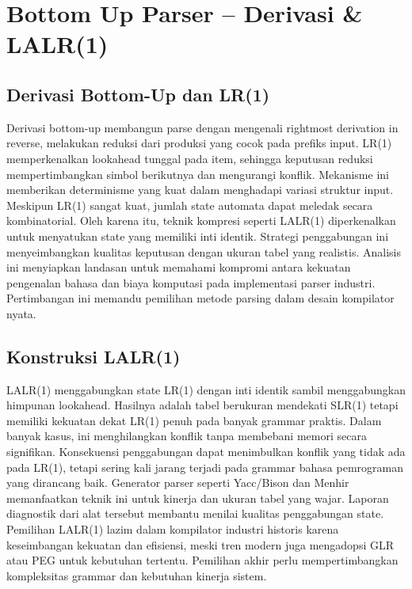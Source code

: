 \documentclass[../main.tex]{subfiles}
\begin{document}
\chapter{Bottom Up Parser – Derivasi \& LALR(1)}
\label{ch:lalr1}

\section{Derivasi Bottom-Up dan LR(1)}
Derivasi bottom-up membangun parse dengan mengenali rightmost derivation in reverse, melakukan reduksi dari produksi yang cocok pada prefiks input. LR(1) memperkenalkan lookahead tunggal pada item, sehingga keputusan reduksi mempertimbangkan simbol berikutnya dan mengurangi konflik.\cite{aho-dragon-book-2006} Mekanisme ini memberikan determinisme yang kuat dalam menghadapi variasi struktur input.
Meskipun LR(1) sangat kuat, jumlah state automata dapat meledak secara kombinatorial. Oleh karena itu, teknik kompresi seperti LALR(1) diperkenalkan untuk menyatukan state yang memiliki inti identik.\cite{grune-parsing} Strategi penggabungan ini menyeimbangkan kualitas keputusan dengan ukuran tabel yang realistis.
Analisis ini menyiapkan landasan untuk memahami kompromi antara kekuatan pengenalan bahasa dan biaya komputasi pada implementasi parser industri. Pertimbangan ini memandu pemilihan metode parsing dalam desain kompilator nyata.

\section{Konstruksi LALR(1)}
LALR(1) menggabungkan state LR(1) dengan inti identik sambil menggabungkan himpunan lookahead. Hasilnya adalah tabel berukuran mendekati SLR(1) tetapi memiliki kekuatan dekat LR(1) penuh pada banyak grammar praktis.\cite{aho-dragon-book-2006} Dalam banyak kasus, ini menghilangkan konflik tanpa membebani memori secara signifikan.
Konsekuensi penggabungan dapat menimbulkan konflik yang tidak ada pada LR(1), tetapi sering kali jarang terjadi pada grammar bahasa pemrograman yang dirancang baik. Generator parser seperti Yacc/Bison dan Menhir memanfaatkan teknik ini untuk kinerja dan ukuran tabel yang wajar.\cite{bison-manual, menhir} Laporan diagnostik dari alat tersebut membantu menilai kualitas penggabungan state.
Pemilihan LALR(1) lazim dalam kompilator industri historis karena keseimbangan kekuatan dan efisiensi, meski tren modern juga mengadopsi GLR atau PEG untuk kebutuhan tertentu. Pemilihan akhir perlu mempertimbangkan kompleksitas grammar dan kebutuhan kinerja sistem.

\IfSubfilesClassLoaded{%
\printbibliography
}{}
\end{document}
